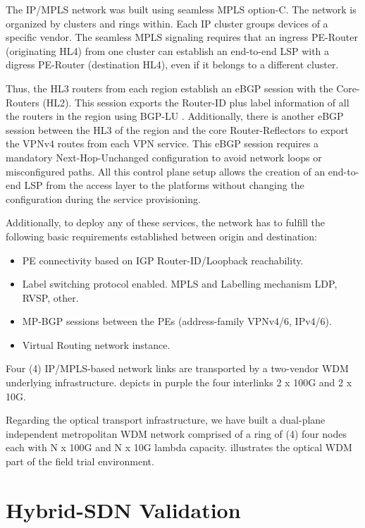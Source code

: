 \documentclass[a4paper,fleqn]{cas-dc}
\begin{document}
The IP/MPLS network was built using seamless MPLS option-C. The network is organized by clusters and rings within. Each IP cluster groups devices of a specific vendor. The seamless MPLS signaling requires that an ingress PE-Router (originating HL4) from one cluster can establish an end-to-end LSP with a digress PE-Router (destination HL4), even if it belongs to a different cluster.

Thus, the HL3 routers from each region establish an eBGP session with the Core-Routers (HL2). This session exports the Router-ID plus label information of all the routers in the region using BGP-LU \cite{rfc8277}. Additionally, there is another eBGP session between the HL3 of the region and the core Router-Reflectors to export the VPNv4 routes from each VPN service. This eBGP session requires a mandatory Next-Hop-Unchanged configuration to avoid network loops or misconfigured paths. All this control plane setup allows the creation of an end-to-end LSP from the access layer to the platforms without changing the configuration during the service provisioning.

Additionally, to deploy any of these services, the network has to fulfill the following basic requirements established between origin and destination:
\begin{itemize}
    \item PE connectivity based on IGP Router-ID/Loopback reachability.
    \item Label switching protocol enabled. MPLS and Labelling mechanism LDP, RVSP, other. 
    \item MP-BGP sessions between the PEs (address-family VPNv4/6, IPv4/6).
    \item Virtual Routing network instance. 
\end{itemize}

Four (4) IP/MPLS-based network links are transported by a two-vendor WDM underlying infrastructure.  depicts in purple the four interlinks 2 x 100G and 2 x 10G.  

Regarding the optical transport infrastructure, we have built a dual-plane independent metropolitan WDM network comprised of a ring of (4) four nodes each with N x 100G and N x 10G lambda capacity.  illustrates the optical WDM part of the field trial environment.


\section{Hybrid-SDN Validation}
\label{section:results}
\end{document}
